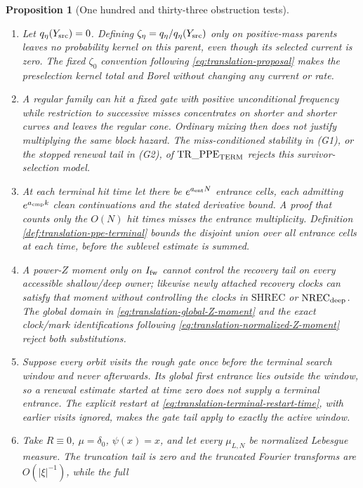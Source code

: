 \documentclass[11pt]{article}
\newtheorem{proposition}[theorem]{Proposition}
\begin{document}
\begin{proposition}[One hundred and thirty-three obstruction tests]
\begin{enumerate}[label=\textup{(T\arabic*)}]
\item Let $q_\eta(Y_{\rm src})=0$.  Defining
      $\zeta_\eta=q_\eta/q_\eta(Y_{\rm src})$ only on positive-mass parents
      leaves no probability kernel on this parent, even though its selected
      current is zero.  The fixed $\zeta_0$ convention following
      \eqref{eq:translation-proposal} makes the preselection kernel total and
      Borel without changing any current or rate.
\item A regular family can hit a fixed gate with positive unconditional
      frequency while restriction to successive misses concentrates on
      shorter and shorter curves and leaves the regular cone.  Ordinary
      mixing then does not justify multiplying the same block hazard.  The
      miss-conditioned stability in \textup{(G1)}, or the stopped renewal
      tail in \textup{(G2)}, of $\mathrm{TR\_PPE}_{\rm TERM}$ rejects this
      survivor-selection model.
\item At each terminal hit time let there be $e^{a_{\rm ent}N}$ entrance
      cells, each admitting $e^{a_{\rm cmp}k}$ clean continuations and the
      stated derivative bound.  A proof that counts only the $O(N)$ hit
      times misses the entrance multiplicity.  Definition
      \ref{def:translation-ppe-terminal} bounds the disjoint union over all
      entrance cells at each time, before the sublevel estimate is summed.
\item A power-$Z$ moment only on $I_{\rm fw}$ cannot control the recovery
      tail on every accessible shallow/deep owner; likewise newly attached
      recovery clocks can satisfy that moment without controlling the clocks
      in $\mathrm{SHREC}$ or $\mathrm{NREC}_{\rm deep}$.  The global domain
      in \eqref{eq:translation-global-Z-moment} and the exact clock/mark
      identifications following
      \eqref{eq:translation-normalized-Z-moment} reject both substitutions.
\item Suppose every orbit visits the rough gate once before the terminal
      search window and never afterwards.  Its global first entrance lies
      outside the window, so a renewal estimate started at time zero does not
      supply a terminal entrance.  The explicit restart at
      \eqref{eq:translation-terminal-restart-time}, with earlier visits
      ignored, makes the gate tail apply to exactly the active window.
\item Take $R\equiv0$, $\mu=\delta_0$, $\psi(x)=x$, and let every
      $\mu_{L,N}$ be normalized Lebesgue measure.  The truncation tail is zero
      and the truncated Fourier transforms are $O(|\xi|^{-1})$, while the full

\end{enumerate}
\end{proposition}
\end{document}
